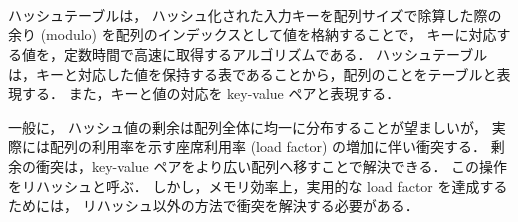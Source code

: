 \thispagestyle{empty} %

　\\
\\
\\
\\
\\
\\
\\
\\

ハッシュテーブルは，
ハッシュ化された入力キーを配列サイズで除算した際の余り (modulo) を配列のインデックスとして値を格納することで，
キーに対応する値を，定数時間で高速に取得するアルゴリズムである．
ハッシュテーブルは，キーと対応した値を保持する表であることから，配列のことをテーブルと表現する．
また，キーと値の対応を key-value ペアと表現する．

一般に，
ハッシュ値の剰余は配列全体に均一に分布することが望ましいが，
実際には配列の利用率を示す座席利用率 (load factor) の増加に伴い衝突する．
剰余の衝突は，key-value ペアをより広い配列へ移すことで解決できる．
この操作をリハッシュと呼ぶ．
しかし，メモリ効率上，実用的な load factor を達成するためには，
リハッシュ以外の方法で衝突を解決する必要がある．

